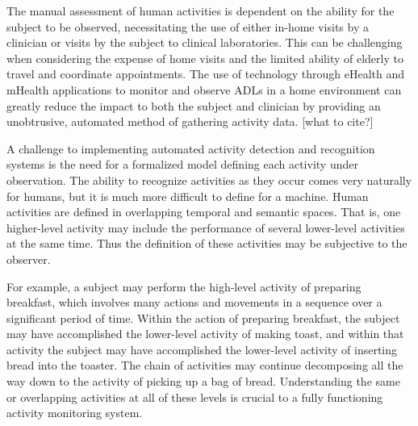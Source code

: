\documentclass[12pt]{report}
\begin{document}
The manual assessment of human activities is dependent on the ability for the subject to be observed, necessitating the use of either in-home visits by a clinician or visits by the subject to clinical laboratories. This can be challenging when considering the expense of home visits and the limited ability of elderly to travel and coordinate appointments. The use of technology through eHealth and mHealth applications to monitor and observe ADLs in a home environment can greatly reduce the impact to both the subject and clinician by providing an unobtrusive, automated method of gathering activity data. [what to cite?]

A challenge to implementing automated activity detection and recognition systems is the need for a formalized model defining each activity under observation. The ability to recognize activities as they occur comes very naturally for humans, but it is much more difficult to define for a machine. Human activities are defined in overlapping temporal and semantic spaces. That is, one higher-level activity may include the performance of several lower-level activities at the same time. Thus the definition of these activities may be subjective to the observer. 

For example, a subject may perform the high-level activity of preparing breakfast, which involves many actions and movements in a sequence over a significant period of time. Within the action of preparing breakfast, the subject may have accomplished the lower-level activity of making toast, and within that activity the subject may have accomplished the lower-level activity of inserting bread into the toaster. The chain of activities may continue decomposing all the way down to the activity of picking up a bag of bread. Understanding the same or overlapping activities at all of these levels is crucial to a fully functioning activity monitoring system.


\end{document}
